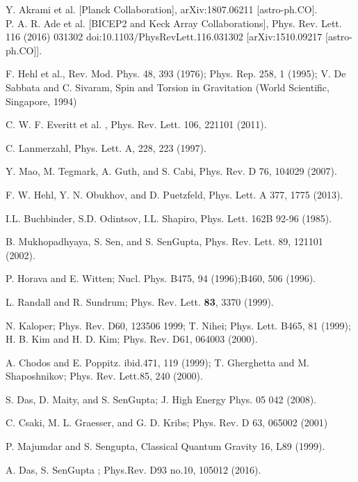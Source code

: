 \documentclass[a4paper]{article}
\begin{document}
\begin{thebibliography}{99}
Y. Akrami et al. [Planck Collaboration], arXiv:1807.06211 [astro-ph.CO].\\
P. A. R. Ade et al. [BICEP2 and Keck Array Collaborations], Phys. Rev. Lett. 116 (2016) 031302 
doi:10.1103/PhysRevLett.116.031302 [arXiv:1510.09217 [astro-ph.CO]].
  
   F. Hehl et al., Rev. Mod. Phys. 48, 393 (1976); Phys. Rep. 258,  1  (1995);  V.  De  Sabbata  and  
   C.  Sivaram, Spin  and Torsion   in   Gravitation (World   Scientific,   Singapore, 1994)

 C. W. F. Everitt et al. , Phys. Rev. Lett. 106, 221101 (2011).

 C. Lanmerzahl, Phys. Lett. A, 228, 223 (1997).
 
 Y. Mao, M. Tegmark, A. Guth, and S. Cabi, Phys. Rev. D 76, 104029 (2007).
 
 F. W. Hehl, Y. N. Obukhov, and D. Puetzfeld, Phys. Lett. A 377, 1775 (2013).
 
 I.L. Buchbinder, S.D. Odintsov, I.L. Shapiro, Phys. Lett. 162B 92-96 (1985).

 B. Mukhopadhyaya, S. Sen, and S. SenGupta, Phys. Rev. Lett. 89, 121101 (2002).
 
P. Horava and E. Witten; Nucl. Phys. B475, 94 (1996);B460, 506 (1996).

L. Randall and R. Sundrum; Phys. Rev. Lett. {\bf 83}, 3370 (1999).

 N. Kaloper; Phys. Rev. D60, 123506 1999; T. Nihei; Phys. Lett. B465, 81 (1999); H. B. Kim and H. D. Kim; Phys. Rev. D61, 064003 (2000).
  
  A. Chodos and E. Poppitz. ibid.471, 119 (1999); T. Gherghetta and M. Shaposhnikov; Phys. Rev. Lett.85, 240 (2000).
 
 S. Das, D. Maity, and S. SenGupta; J. High Energy Phys. 05 042 (2008).
 
C. Csaki, M. L. Graesser, and G. D. Kribs; Phys. Rev. D 63, 065002 (2001)
 
 P. Majumdar and S. Sengupta, Classical Quantum Gravity 16, L89 (1999).
 
 A. Das, S. SenGupta ; Phys.Rev. D93 no.10, 105012 (2016).
 

\end{thebibliography}
\end{document}
